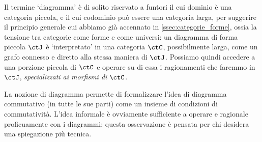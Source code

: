 \begin{remark}
	Il termine `diagramma' è di solito riservato a funtori il cui dominio è una categoria piccola, e il cui codominio può essere una categoria larga, per suggerire il principio generale cui abbiamo già accennato in \ref{ssec:categorie_forme}, ossia la tensione tra categorie come forme e come universi: un diagramma di forma piccola \(\ctJ\) è `interpretato' in una categoria \(\ctC\), possibilmente larga, come un grafo connesso e diretto alla stessa maniera di \(\ctJ\). Possiamo quindi accedere a una porzione piccola di \(\ctC\) e operare su di essa i ragionamenti che faremmo in \(\ctJ\), \emph{specializzati ai morfismi di \(\ctC\)}.
\end{remark}
La nozione di diagramma permette di formalizzare l'idea di diagramma commutativo (in tutte le sue parti) come un insieme di condizioni di commutatività. L'idea informale è ovviamente sufficiente a operare e ragionale proficuamente con i diagrammi: questa osservazione è pensata per chi desidera una spiegazione più tecnica.
